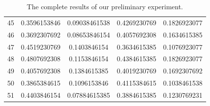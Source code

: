 \documentclass{article}
\begin{document}
\begin{table}[ht]
\begin{tabular}{|c|c|c|c|c|}
45 & 0.3596153846 & 0.09038461538 & 0.4269230769   & 0.1826923077  \\ 
46 & 0.3692307692 & 0.08653846154 & 0.4057692308   & 0.1634615385  \\ 
47 & 0.4519230769 & 0.1403846154  & 0.3634615385   & 0.1076923077  \\ 
48 & 0.4807692308 & 0.1153846154  & 0.4384615385   & 0.1826923077  \\ 
49 & 0.4057692308 & 0.1384615385  & 0.4019230769   & 0.1692307692  \\ 
50 & 0.3865384615 & 0.1096153846  & 0.4115384615   & 0.1038461538  \\ 
51 & 0.4403846154 & 0.07884615385 & 0.3884615385   & 0.1230769231  \\ \hline
\end{tabular}
\centering
\vspace{10pt}
\caption{The complete results of our preliminary experiment.}
\label{results}
\end{table}


\end{document}
